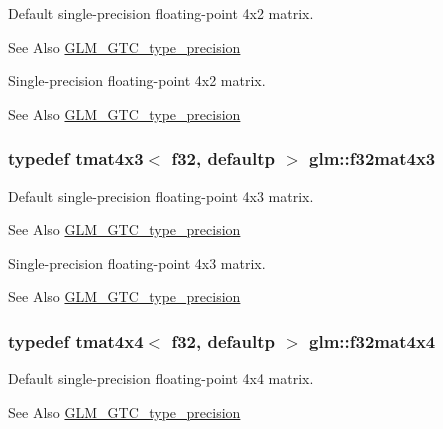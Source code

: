 Default single-\/precision floating-\/point 4x2 matrix. \begin{DoxySeeAlso}{See Also}
\hyperlink{group__gtc__type__precision}{G\-L\-M\-\_\-\-G\-T\-C\-\_\-type\-\_\-precision}
\end{DoxySeeAlso}
Single-\/precision floating-\/point 4x2 matrix. \begin{DoxySeeAlso}{See Also}
\hyperlink{group__gtc__type__precision}{G\-L\-M\-\_\-\-G\-T\-C\-\_\-type\-\_\-precision} 
\end{DoxySeeAlso}
\hypertarget{group__gtc__type__precision_gad68d998fa74028e02bfadd4778bd549a}{
\subsubsection[{f32mat4x3}]{\setlength{\rightskip}{0pt plus 5cm}typedef tmat4x3$<$ f32, defaultp $>$ {\bf glm\-::f32mat4x3}}}\label{group__gtc__type__precision_gad68d998fa74028e02bfadd4778bd549a}
Default single-\/precision floating-\/point 4x3 matrix. \begin{DoxySeeAlso}{See Also}
\hyperlink{group__gtc__type__precision}{G\-L\-M\-\_\-\-G\-T\-C\-\_\-type\-\_\-precision}
\end{DoxySeeAlso}
Single-\/precision floating-\/point 4x3 matrix. \begin{DoxySeeAlso}{See Also}
\hyperlink{group__gtc__type__precision}{G\-L\-M\-\_\-\-G\-T\-C\-\_\-type\-\_\-precision} 
\end{DoxySeeAlso}
\hypertarget{group__gtc__type__precision_gac4a4b2671cbf50ab95c55fce2bfcd811}{
\subsubsection[{f32mat4x4}]{\setlength{\rightskip}{0pt plus 5cm}typedef tmat4x4$<$ f32, defaultp $>$ {\bf glm\-::f32mat4x4}}}\label{group__gtc__type__precision_gac4a4b2671cbf50ab95c55fce2bfcd811}
Default single-\/precision floating-\/point 4x4 matrix. \begin{DoxySeeAlso}{See Also}
\hyperlink{group__gtc__type__precision}{G\-L\-M\-\_\-\-G\-T\-C\-\_\-type\-\_\-precision}
\end{DoxySeeAlso}
